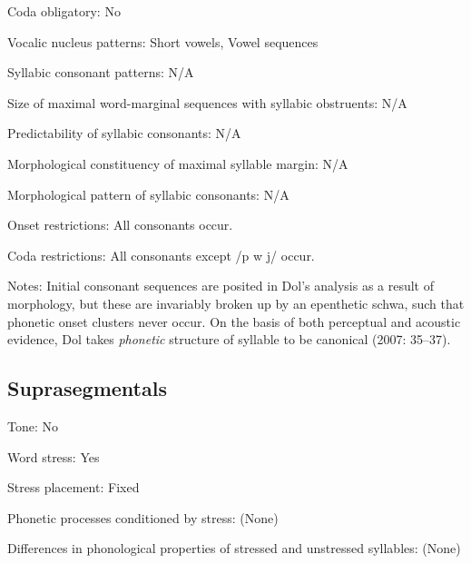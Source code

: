{\begin{appendixdesc}
\item[Coda obligatory:] No

\item[Vocalic nucleus patterns:] Short vowels, Vowel sequences

\item[Syllabic consonant patterns:] N/A

\item[Size of maximal word-marginal sequences with syllabic obstruents:] N/A

\item[Predictability of syllabic consonants:] N/A

\item[Morphological constituency of maximal syllable margin:] N/A

\item[Morphological pattern of syllabic consonants:] N/A

\item[Onset restrictions:] All consonants occur.

\item[Coda restrictions:] All consonants except /p w j/ occur.

\item[Notes:] Initial consonant sequences are posited in Dol’s analysis as a result of morphology, but these are invariably broken up by an epenthetic schwa, such that phonetic onset clusters never occur. On the basis of both perceptual and acoustic evidence, Dol takes \textit{phonetic} structure of syllable to be canonical (2007: 35--37).

\end{appendixdesc}
\subsection*{Suprasegmentals}
\begin{appendixdesc}

\item[Tone:] No

\item[Word stress:] Yes

\item[Stress placement:] Fixed

\item[Phonetic processes conditioned by stress:] (None)

\item[Differences in phonological properties of stressed and unstressed syllables:] (None)


\end{appendixdesc}}
